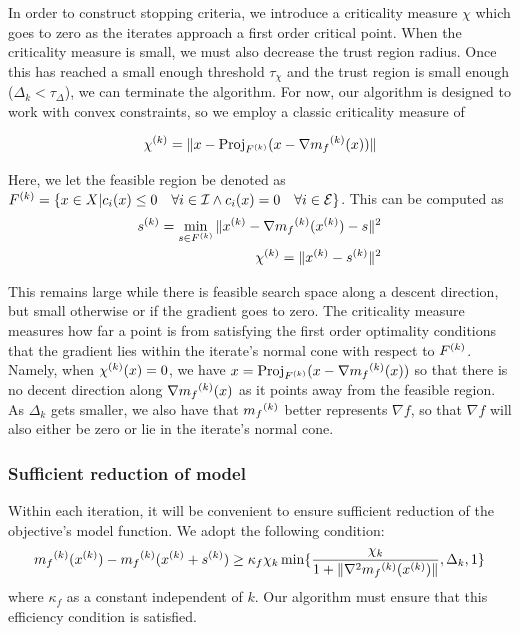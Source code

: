 In order to construct stopping criteria, we introduce a criticality measure $\chi$ which goes to zero as the iterates approach a first order critical point.
When the criticality measure is small, we must also decrease the trust region radius.
Once this has reached a small enough threshold $\tau_{\chi}$ and the trust region is small enough ($\Delta_k < \tau_{\Delta}$), we can terminate the algorithm.
For now, our algorithm is designed to work with convex constraints, so we employ a classic criticality measure of

\[
{\chi^{(k)}} = \|x - \text{Proj}_{{F}^{(k)}}(x - \nabla {{m}_f}^{(k)}(x))\|
\]

Here, we let the feasible region be denoted as ${F}^{(k)} = \{x \in X | c_i(x) \le 0 \quad \forall i \in \mathcal I \wedge c_i(x) = 0 \quad \forall i \in \mathcal E \}$.
This can be computed as 
\begin{align}
\label{critical}
{s}^{(k)} = \min_{s \in {F}^{(k)}} \|{x}^{(k)} - \nabla {{m}_f}^{(k)}({x}^{(k)}) - s\|^2 \\
{\chi^{(k)}} = \|{x}^{(k)} - {s}^{(k)} \|^2 \\
\end{align}

This remains large while there is feasible search space along a descent direction, but small otherwise or if the gradient goes to zero.
The criticality measure measures how far a point is from satisfying the first order optimality conditions that the gradient lies within the iterate's normal cone with respect to ${F}^{(k)}$.
Namely, when $ {\chi^{(k)}}(x) = 0$, we have $x = \text{Proj}_{{F}^{(k)}}(x - \nabla {{m}_f}^{(k)}(x))$ so that there is no decent direction along $\nabla {{m}_f}^{(k)}(x)$ as it points away from the feasible region.
As $\Delta_k$ gets smaller, we also have that ${{m}_f}^{(k)}$ better represents $\nabla f$, so that $\nabla f$ will also either be zero or lie in the iterate's normal cone.

\subsubsection{Sufficient reduction of model}

Within each iteration, it will be convenient to ensure sufficient reduction of the objective's model function.
We adopt the following condition:
\begin{equation}
\label{efficiency}
{{m}_f}^{(k)}({x}^{(k)}) - {{m}_f}^{(k)}({x}^{(k)} + {s}^{(k)}) \ge \kappa_f \chi_k \min\{ \frac{\chi_k}{1+\|\nabla^2 {{m}_f}^{(k)}({x}^{(k)})\|}, \Delta_k, 1 \}
\end{equation}
where $\kappa_f$ as a constant independent of $k$.
Our algorithm must ensure that this efficiency condition is satisfied.

